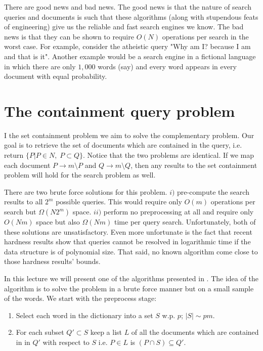 \documentclass{article}
\begin{document}
There are good news and bad news. The good news is that the nature of search queries and documents is such
that these algorithms (along with stupendous feats of engineering) give us the reliable and fast search engines we know.
The bad news is that they can be shown to require $O(N)$ operations per search in the worst case.
For example, consider the atheistic query "Why am I? because I am and that is it". Another example would
be a search engine in a fictional language in which there are only $1,000$ words (say) and every word appears
in every document with equal probability. 


\section{The containment query problem}
I the set containment problem we aim to solve the complementary problem. Our goal is to retrieve
the set of documents which are contained in the query, i.e. return $\{P | P \in N , \; P \subset Q\}$.
Notice that the two problems are identical. If we map each document $P \rightarrow m \setminus P$ and
$Q \rightarrow m \setminus Q$, then any results to the set containment problem will hold for the search problem as well.

There are two brute force solutions for this problem. 
$i)$ pre-compute the search results to all $2^m$ possible queries.
This would require only $O(m)$ operations per search but $\Omega(N2^m)$ space.
$ii)$ perform no preprocessing at all and require only $O(Nm)$ space but also $\Omega(Nm)$ time per query search.
Unfortunately, both of these solutions are unsatisfactory. Even more unfortunate is the fact that recent 
hardness results show that queries cannot be resolved in logarithmic time if the data structure is of polynomial size.
That said, no known algorithm come close to those hardness results' bounds.



In this lecture we will present one of the algorithms presented in \cite{CIP02}.
The idea of the algorithm is to solve the problem in a brute force manner but on a small sample of the words.
We start with the  preprocess stage: 
\begin{enumerate}
\item Select each word in the dictionary into a set $S$ w.p. $p$; $|S| \sim pm$.
\item For each subset $Q' \subset S$ keep a list $L$ of all the documents which are contained in
in $Q'$ with respect to $S$ i.e. $P \in L$ is $(P \cap S) \subseteq Q'$. 
\end{enumerate}
\end{document}

